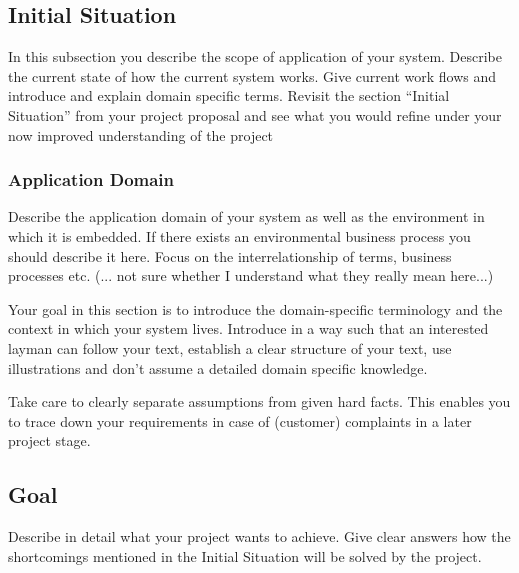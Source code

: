 \documentclass[12pt]{article}
\theoremstyle{definition}
\newenvironment{explanation}{%
   \setlength{\parindent}{0pt}
   \itshape
   \color{blue}
}{}
\begin{document}
\subsection{Initial Situation}
\begin{explanation}
In this subsection you describe the scope of application of your system. Describe the current state of how the current system works. Give current work flows and introduce and explain domain specific terms. Revisit the section “Initial Situation” from your project proposal and see what you would refine under your now improved understanding of the project
\end{explanation}

\subsubsection{Application Domain}
\begin{explanation}
Describe the application domain of your system as well as the environment in which it is embedded. If there exists an environmental business process you should describe it here. Focus on the interrelationship of terms, business processes etc. (... not sure whether I understand what they really mean here...)

Your goal in this section is to introduce the domain-specific terminology and the context in which your system lives. Introduce in a way such that an interested layman can follow your text, establish a clear structure of your text, use illustrations and don’t assume a detailed domain specific knowledge.

Take care to clearly separate assumptions from given hard facts. This enables you to trace down your requirements in case of (customer) complaints in a later project stage.
\end{explanation}

\subsection{Goal}
\begin{explanation}
Describe in detail what your project wants to achieve. Give clear answers how the shortcomings mentioned in the Initial Situation will be solved by the project.
\end{explanation}
\pagebreak
\end{document}

